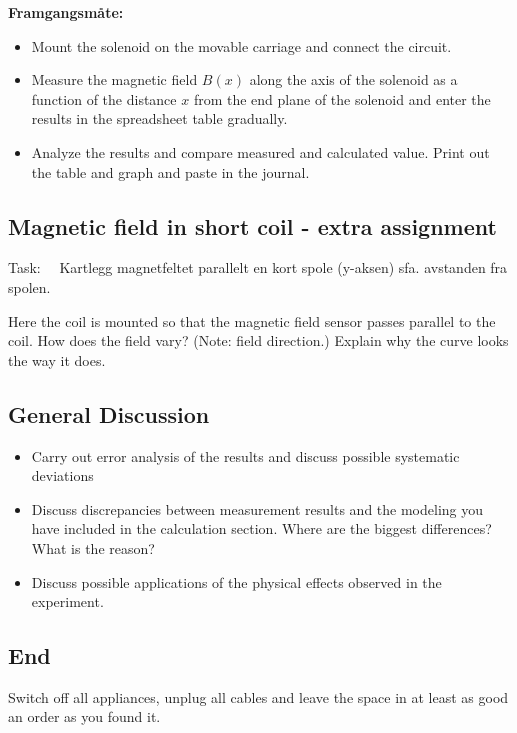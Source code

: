 \documentclass[../Elmag-labhefte-2020.tex]{subfiles}
\begin{document}
\textbf{Framgangsmåte:}
\vspace{-5mm}
\begin{itemize}
    \item Mount the solenoid on the movable carriage and connect the circuit.
    \item Measure the magnetic field $B(x)$ along the axis of the solenoid as a function of the distance $x$ from the end plane of the solenoid and enter the results in the spreadsheet table gradually.
    \item Analyze the results and compare measured and calculated value. Print out the table and graph and paste in the journal.
\end{itemize}

\subsection{Magnetic field in short coil - extra assignment}

Task: \ \
{\itsf Kartlegg magnetfeltet parallelt en kort spole (y-aksen) sfa. avstanden fra spolen.}
 

Here the coil is mounted so that the magnetic field sensor passes parallel to the coil. How does the field vary? (Note: field direction.) Explain why the curve looks the way it does.

\subsection{General Discussion}

\begin{itemize}
   \item Carry out error analysis of the results and discuss possible systematic deviations
   \item Discuss discrepancies between measurement results and the modeling you have included in the calculation section. Where are the biggest differences? What is the reason?
    \item Discuss possible applications of the physical effects observed in the experiment.
\end{itemize}

\subsection{End}

Switch off all appliances, unplug all cables and leave the space in at least as good an order as you found it.
\end{document}
